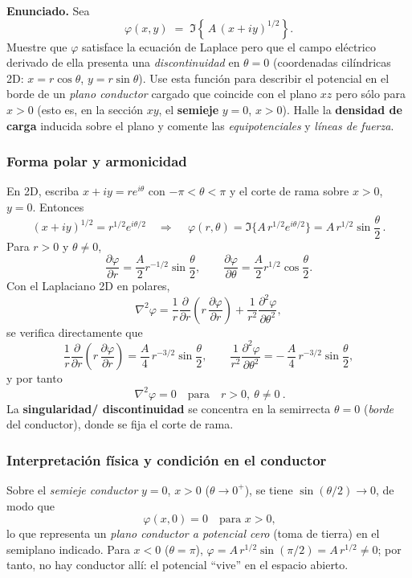 \documentclass{article}
\begin{document}
\textbf{Enunciado.} Sea 
\[
\varphi(x,y)\;=\;\Im\!\left\{\,A\,(x+i y)^{1/2}\right\}.
\]
Muestre que $\varphi$ satisface la ecuación de Laplace pero que el campo eléctrico derivado de ella presenta una \emph{discontinuidad} en $\theta=0$ (coordenadas cilíndricas 2D: $x=r\cos\theta$, $y=r\sin\theta$). Use esta función para describir el potencial en el borde de un \emph{plano conductor} cargado que coincide con el plano $xz$ pero sólo para $x>0$ (esto es, en la sección $xy$, el \textbf{semieje} $y=0$, $x>0$). Halle la \textbf{densidad de carga} inducida sobre el plano y comente las \emph{equipotenciales} y \emph{líneas de fuerza}.

\subsubsection*{Forma polar y armonicidad}
En 2D, escriba $x+iy=re^{i\theta}$ con $-\pi<\theta<\pi$ y el corte de rama sobre $x>0$, $y=0$. Entonces
\[
(x+iy)^{1/2}=r^{1/2}e^{i\theta/2}
\quad\Rightarrow\quad
\boxed{\,\varphi(r,\theta)=\Im\!\big\{A\,r^{1/2}e^{i\theta/2}\big\}=A\,r^{1/2}\sin\!\frac{\theta}{2}\,}.
\]
Para $r>0$ y $\theta\neq 0$,
\[
\frac{\partial \varphi}{\partial r}=\frac{A}{2}r^{-1/2}\sin\!\frac{\theta}{2},\qquad
\frac{\partial \varphi}{\partial \theta}=\frac{A}{2}r^{1/2}\cos\!\frac{\theta}{2}.
\]
Con el Laplaciano 2D en polares,
\[
\nabla^2\varphi=\frac{1}{r}\frac{\partial}{\partial r}\!\left(r\,\frac{\partial\varphi}{\partial r}\right)
+\frac{1}{r^2}\frac{\partial^2\varphi}{\partial \theta^2},
\]
se verifica directamente que
\[
\frac{1}{r}\frac{\partial}{\partial r}\!\left(r\,\frac{\partial\varphi}{\partial r}\right)
=\frac{A}{4}\,r^{-3/2}\sin\!\frac{\theta}{2},\qquad
\frac{1}{r^2}\frac{\partial^2\varphi}{\partial \theta^2}
=-\,\frac{A}{4}\,r^{-3/2}\sin\!\frac{\theta}{2},
\]
y por tanto
\[
\boxed{\ \nabla^2\varphi=0\quad\text{para}\quad r>0,\ \theta\neq 0\ }.
\]
La \textbf{singularidad/ discontinuidad} se concentra en la semirrecta $\theta=0$ (\emph{borde} del conductor), donde se fija el corte de rama.

\subsubsection*{Interpretación física y condición en el conductor}
Sobre el \emph{semieje conductor} $y=0$, $x>0$ ($\theta\to 0^{+}$), se tiene $\sin(\theta/2)\to 0$, de modo que
\[
\boxed{\ \varphi(x,0)=0\quad\text{para } x>0,}
\]
lo que representa un \emph{plano conductor a potencial cero} (toma de tierra) en el semiplano indicado. Para $x<0$ ($\theta=\pi$), $\varphi=A\,r^{1/2}\sin(\pi/2)=A\,r^{1/2}\neq 0$; por tanto, no hay conductor allí: el potencial “vive” en el espacio abierto.
\end{document}
